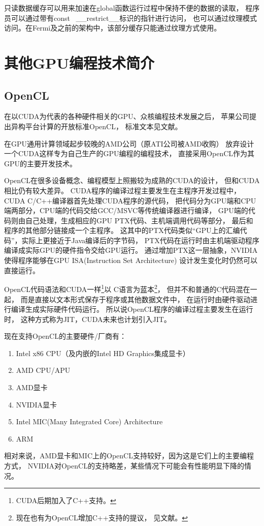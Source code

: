 只读数据缓存可以用来加速在global函数运行过程中保持不便的数据的读取，
程序员可以通过带有const  \_\_restrict\_\_标识的指针进行访问，
也可以通过纹理模式访问。在Fermi及之前的架构中，该部分缓存只能通过纹理方式使用。
\cite{cudadoc-KeplerGK110ArchitectureWhitepaper}



\section{其他GPU编程技术简介}

\label{sec:gpu.other}
\subsection{OpenCL}

在以CUDA为代表的各种硬件相关的GPU、众核编程技术发展之后，
苹果公司提出异构平台计算的开放标准OpenCL，
标准文本见文献。

在GPU通用计算领域起步较晚的AMD公司（原ATI公司被AMD收购）
放弃设计一个CUDA这样专为自己生产的GPU编程的编程技术，
直接采用OpenCL作为其GPU的主要开发技术。

OpenCL在很多设备概念、编程模型上照搬较为成熟的CUDA的设计，
但和CUDA相比仍有较大差异。
CUDA程序的编译过程主要发生在主程序开发过程中，CUDA C/C++编译器首先处理CUDA程序的源代码，
把代码分为GPU端和CPU端两部分，CPU端的代码交给GCC/MSVC等传统编译器进行编译，
GPU端的代码则由自己处理，生成相应的GPU PTX代码、主机端调用代码等部分，
最后和程序的其他部分链接成一个主程序。
这其中的PTX代码类似“GPU上的汇编代码”，实际上更接近于Java编译后的字节码，
PTX代码在运行时由主机端驱动程序编译成实际GPU的硬件指令交给GPU运行。
通过增加PTX这一层抽象，NVIDIA使得程序能够在GPU ISA(Instruction Set Architecture)
设计发生变化时仍然可以直接运行。

OpenCL代码语法和CUDA一样\footnote{CUDA后期加入了C++支持。}以
C语言为蓝本\footnote{现在也有为OpenCL增加C++支持的提议，%
见文献。}，
但并不和普通的C代码混在一起，
而是直接以文本形式保存于程序或其他数据文件中，
在运行时由硬件驱动进行编译生成实际硬件代码运行。
所以说OpenCL程序的编译过程主要发生在运行时，
这种方式称为JIT，CUDA未来也计划引入JIT\cite{MarkGTC2013}。


现在支持OpenCL的主要硬件/厂商有：\cite{opencl-conformant-products}
\begin{enumerate}[1)]
\item Intel x86 CPU（及内嵌的Intel HD Graphics集成显卡）
\item AMD CPU/APU
\item AMD显卡
\item NVIDIA显卡
\item Intel MIC(Many Integrated Core) Architecture
\item ARM
\end{enumerate}
相对来说，AMD显卡和MIC上的OpenCL支持较好，因为这是它们上的主要编程方式，
NVIDIA对OpenCL的支持略差，某些情况下可能会有性能明显下降的情况。


